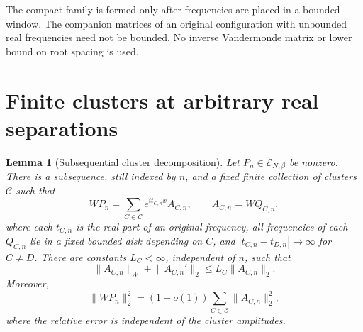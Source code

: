 \documentclass[11pt]{article}
\newtheorem{lemma}[theorem]{Lemma}
\theoremstyle{definition}
\theoremstyle{remark}
\newcommand{\EE}{\mathcal E_{N,\beta}}
\newcommand{\norm}[1]{\lVert #1\rVert}
\begin{document}
The compact family is formed only after frequencies are placed in a
bounded window. The companion matrices of an original configuration with
unbounded real frequencies need not be bounded. No inverse Vandermonde
matrix or lower bound on root spacing is used.

\section{Finite clusters at arbitrary real separations}\label{sec:clusters}

\begin{lemma}[Subsequential cluster decomposition]\label{lem:clusters}
Let $P_n\in\EE$ be nonzero. There is a subsequence, still indexed by $n$,
and a fixed finite collection of clusters $\mathcal C$ such that
\begin{equation}\label{eq:cluster}
 WP_n=\sum_{C\in\mathcal C}e^{it_{C,n}x}A_{C,n},\qquad
 A_{C,n}=WQ_{C,n},
\end{equation}
where each $t_{C,n}$ is the real part of an original frequency,
all frequencies of each $Q_{C,n}$ lie in a fixed bounded disk depending
on $C$, and $|t_{C,n}-t_{D,n}|\to\infty$ for $C\ne D$.
There are constants $L_C<\infty$, independent of $n$, such that
\begin{equation}\label{eq:cluster-envelope}
 \norm{A_{C,n}}_W+\norm{A_{C,n}'}_2\le L_C\norm{A_{C,n}}_2.
\end{equation}
Moreover,
\begin{equation}\label{eq:decouple}
 \norm{WP_n}_2^2=(1+o(1))
 \sum_{C\in\mathcal C}\norm{A_{C,n}}_2^2,
\end{equation}
where the relative error is independent of the cluster amplitudes.
\end{lemma}
\end{document}
